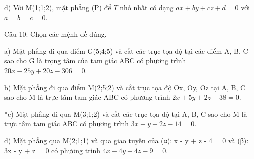 \documentclass[a4paper,12pt]{article}
\begin{document}
d) Với M(1;1;2), mặt phẳng (P) để \(T\) nhỏ nhất có dạng \(ax+by+cz+d=0\) với \(a=b=c=0\).



Câu 10: Chọn các mệnh đề đúng.

a) Mặt phẳng đi qua điểm G(5;4;5) và cắt các trục tọa độ tại các điểm A, B, C sao cho G là trọng tâm của tam giác ABC có phương trình \(20x - 25y + 20z - 306 = 0\).

b) Mặt phẳng đi qua điểm M(2;5;2) và cắt trục tọa độ Ox, Oy, Oz tại A, B, C sao cho M là trực tâm tam giác ABC có phương trình \(2x + 5y + 2z - 38 = 0\).

*c) Mặt phẳng đi qua M(3;1;2) và cắt các trục tọa độ tại A, B, C sao cho M là trực tâm tam giác ABC có phương trình \(3x + y + 2z - 14 = 0\).

d) Mặt phẳng qua M(2;1;1) và qua giao tuyến của (α): x - y + z - 4 = 0 và (β): 3x - y + z = 0 có phương trình \(4x - 4y + 4z - 9 = 0\).
\end{document}
